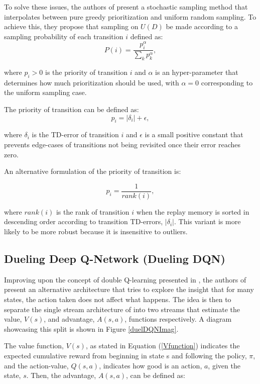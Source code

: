 To solve these issues, the authors of \cite{prioexperience} present a stochastic sampling method that interpolates between pure greedy prioritization and uniform random sampling. To achieve this, they propose that sampling on $U(D)$ be made according to a sampling probability of each transition $i$ defined as:
\begin{equation}
    P(i) = \frac{p_i^\alpha}{\sum_k p_k^\alpha} ,
\end{equation}

where $p_i>0$ is the priority of transition $i$ and $\alpha$ is an hyper-parameter that determines how much prioritization should be used, with $\alpha = 0$ corresponding to the uniform sampling case.

The priority of transition can be defined as:
\begin{equation}
    p_i = |\delta_i|+\epsilon ,
\end{equation}

where $\delta_i$ is the \acrshort{TD}-error of transition $i$ and $\epsilon$ is a small positive constant that prevents edge-cases of transitions not being revisited once their error reaches zero.

An alternative formulation of the priority of transition is:

\begin{equation}
    p_i = \frac{1}{rank(i)} ,
\end{equation}

where $rank(i)$ is the rank of transition $i$ when the replay memory is sorted in descending order according to transition \acrshort{TD}-errors, $|\delta_i|$. This variant is more likely to be more robust because it is insensitive to outliers.

\subsection{Dueling Deep Q-Network (Dueling DQN)}
\noindent Improving upon the concept of double Q-learning presented in \cite{doubleDQN}, the authors of \cite{duelingDQN} present an alternative architecture that tries to explore the insight that for many states, the action taken does not affect what happens. The idea is then to separate the single stream architecture of \cite{DQN} into two streams that estimate the value, $V(s)$, and advantage, $A(s,a)$, functions respectively. A diagram showcasing this split is shown in Figure \ref{duelDQNImag}. 

The value function, $V(s)$, as stated in Equation (\ref{Vfunction}) indicates the expected cumulative reward from beginning in state s and following the policy, $\pi$, and the action-value, $Q(s,a)$, indicates how good is an action, $a$, given the state, $s$. Then, the advantage, $A(s,a)$, can be defined as:

